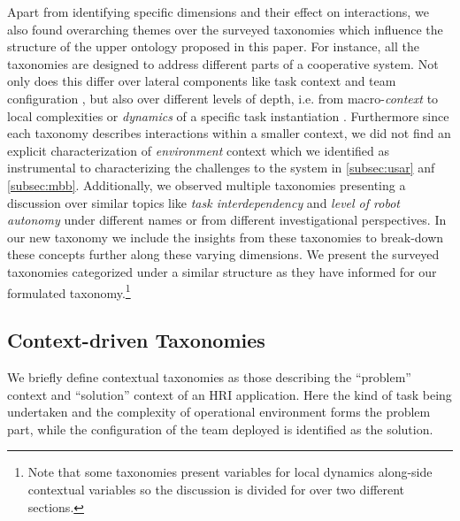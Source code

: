 \documentclass[letterpaper, 10 pt, conference]{ieeeconf}  %
\theoremstyle{definition}
\begin{document}
Apart from identifying specific dimensions and their effect on interactions, we also found overarching themes over the surveyed taxonomies which influence the structure of the upper ontology proposed in this paper.
For instance, all the taxonomies are designed to address different parts of a cooperative system.
Not only does this differ over lateral components like task context \cite{Beer2017} and team configuration \cite{Dudek2002updated, cao1997cooperative}, but also over different levels of depth, i.e. from macro-\textit{context} \cite{Yanco2004updated} to local complexities or \textit{dynamics} of a specific task instantiation \cite{Korsah2013, Beer2014toward}.
Furthermore since each taxonomy describes interactions within a smaller context, we did not find an explicit characterization of \textit{environment} context which we identified as instrumental to characterizing the challenges to the system in \ref{subsec:usar} anf \ref{subsec:mbb}.
Additionally, we observed multiple taxonomies presenting a discussion over similar topics like \textit{task interdependency} and \textit{level of robot autonomy} under different names or from different investigational perspectives.
In our new taxonomy we include the insights from these taxonomies to break-down these concepts further along these varying dimensions.
We present the surveyed taxonomies categorized under a similar structure as they have informed for our formulated taxonomy.\footnote{Note that some taxonomies present variables for local dynamics along-side contextual variables so the discussion is divided for over two different sections.}

\subsection{Context-driven Taxonomies}
We briefly define contextual taxonomies as those describing the ``problem'' context and ``solution'' context of an HRI application.
Here the kind of task being undertaken and the complexity of operational environment forms the problem part, while the configuration of the team deployed is identified as the solution.
\end{document}
